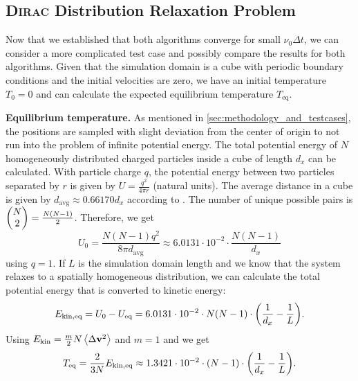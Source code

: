 \subsection{\textsc{Dirac} Distribution Relaxation Problem}

Now that we established that both algorithms converge for small $\nu_0\Delta t$, we can consider a more complicated test case and possibly compare the results for both algorithms. Given that the simulation domain is a cube with periodic boundary conditions and the initial velocities are zero, we have an initial temperature $T_0 = 0$ and can calculate the expected equilibrium temperature $T_\mathrm{eq}$.

\textbf{Equilibrium temperature.} As mentioned in \ref{sec:methodology_and_testcases}, the positions are sampled with slight deviation from the center of origin to not run into the problem of infinite potential energy. The total potential energy of $N$ homogeneously distributed charged particles inside a cube of length $d_x$ can be calculated. With particle charge $q$, the potential energy between two particles separated by $r$ is given by $U = \frac{q^2}{4\pi r}$ (natural units). The average distance in a cube is given by $d_\mathrm{avg} \approx 0.66170d_x$ according to \cite{CubeLinePicking}. The number of unique possible pairs is $\mqty(N \\ 2) = \frac{N(N-1)}{2}$. Therefore, we get 
$$
U_0 = \frac{N(N-1) q^2}{8 \pi d_\mathrm{avg}} \approx 6.0131\cdot 10^{-2} \cdot \frac{N(N-1)}{d_x}
$$
using $q = 1$. If $L$ is the simulation domain length and we know that the system relaxes to a spatially homogeneous distribution, we can calculate the total potential energy that is converted to kinetic energy:
$$
E_\mathrm{kin,eq} = U_0 - U_\mathrm{eq} = 6.0131\cdot 10^{-2} \cdot N(N-1) \cdot \qty(\frac{1}{d_x} - \frac{1}{L}) .
$$
Using $E_\mathrm{kin} = \frac{m}{2} N \expval{\Delta \mathbf{v}^2}$ and $m=1$ and we get 
$$
T_\mathrm{eq} = \frac{2}{3 N} E_\mathrm{kin,eq} \approx 1.3421\cdot 10^{-2} \cdot (N-1) \cdot \qty(\frac{1}{d_x} - \frac{1}{L}) .
$$

